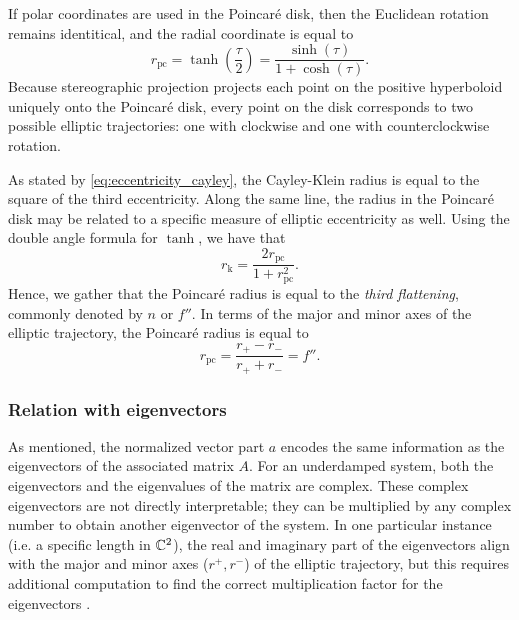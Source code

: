 If polar coordinates are used in the Poincaré disk, then the Euclidean rotation remains identitical, and the radial coordinate is equal to
\begin{equation} 
    r_\text{pc} = \tanh(\frac{\tau}{2}) = \frac{\sinh(\tau)}{1 + \cosh(\tau)}. 
\end{equation}
Because stereographic projection projects each point on the positive hyperboloid uniquely onto the Poincaré disk, every point on the disk corresponds to two possible elliptic trajectories: one with clockwise and one with counterclockwise rotation.

As stated by \cref{eq:eccentricity_cayley}, the Cayley-Klein radius is equal to the square of the third eccentricity. Along the same line, the radius in the Poincaré disk may be related to a specific measure of elliptic eccentricity as well. Using the double angle formula for $ \tanh $, we have that
$$ r_\text{k} = \frac{2r_\text{pc}}{1 + r_\text{pc}^2}. $$
Hence, we gather that the Poincaré radius is equal to the \emph{third flattening}, commonly denoted by $n$ or $f''$. In terms of the major and minor axes of the elliptic trajectory, the Poincaré radius is equal to
$$ r_\text{pc} = \frac{r_+ - r_-}{r_+ + r_-} = f''.$$

\subsubsection{Relation with eigenvectors} 
As mentioned, the normalized vector part $a$ encodes the same information as the eigenvectors of the associated matrix $A$. For an underdamped system, both the eigenvectors and the eigenvalues of the matrix are complex. These complex eigenvectors are not directly interpretable; they can be multiplied by any complex number to obtain another eigenvector of the system. In one particular instance (i.e. a specific length in $\mathbb{C}^2$), the real and imaginary part of the eigenvectors align with the major and minor axes ($r^+, r^-$) of the elliptic trajectory, but this requires additional computation to find the correct multiplication factor for the eigenvectors \cite{Edwards2018}. 

